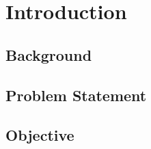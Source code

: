 \chapter{Introduction}

\label{Introduction}

\section{Background}

\section{Problem Statement}

\section{Objective}